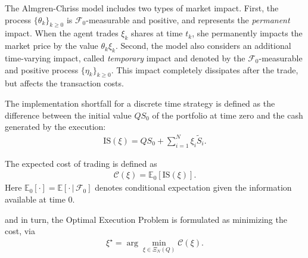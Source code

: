 \documentclass[final,3p,authoryear,12pt]{elsarticle}
\newtheorem{definition}{Definition}
\begin{document}
The Almgren-Chriss model includes two types of market impact. First, the process $\{\theta_k\}_{k\ge0}$ is $\mathcal{F}_{0}$-measurable and positive, and represents the \emph{permanent} impact. When the agent trades  $\xi_k$ shares at time $t_{k}$, she permanently impacts the market price by the value $\theta_k\xi_k$. Second, the model also considers an additional time-varying impact, called \emph{temporary} impact and denoted by the $\mathcal{F}_{0}$-measurable and positive process $\{\eta_k\}_{k\ge0}$. This impact completely dissipates after the trade, but affects the transaction costs.



The implementation shortfall for a discrete time strategy is defined as
the difference between the initial value $Q S_0$ of the portfolio at time
zero and the cash generated by the execution:
\begin{eqnarray}
\label{eq:C}
    \mathrm{IS}(\xi) = Q S_0 + \sum_{i=1}^{N}\xi_{{i}}\tilde{S}_{{i}}.
\end{eqnarray}

The expected cost of trading is defined as
\begin{eqnarray}
\label{eq:DT}
    \mathcal{C}(\xi) = \mathbb{E}_{0}\left[\mathrm{IS}(\xi)\right].
\end{eqnarray}
Here $\mathbb{E}_{0}[\cdot]=\mathbb{E}[\cdot\,|\,\mathcal{F}_{0}]$ denotes
conditional expectation given the information available at time $0$.

and in turn, the Optimal Execution Problem is formulated as minimizing the cost, via
\begin{eqnarray}
\label{problem:DT}
   \xi^{\star} = \arg \min_{\xi\in\Xi_N(Q)}\mathcal{C}(\xi).
\end{eqnarray}
\end{document}
